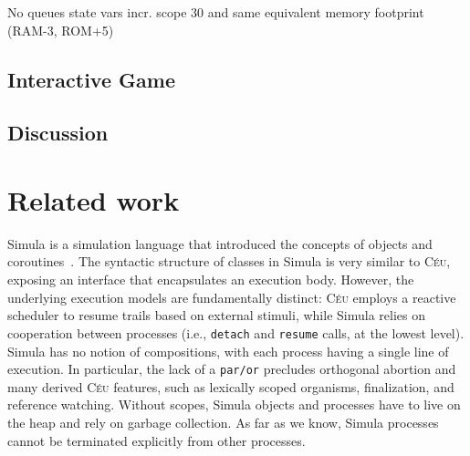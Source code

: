 \documentclass{sigplanconf}
\newcommand{\CEU}{\textsc{C\'{e}u}\xspace}
\newcommand{\code}[1] {{\small{\texttt{#1}}}}
\newcommand{\1}{\;}
\newcommand{\2}{\;\;}
\newcommand{\3}{\;\;\;}
\newcommand{\5}{\;\;\;\;\;}
\begin{document}
No queues
state vars
incr. scope
30%
and same equivalent memory footprint (RAM-3, ROM+5)


\subsection{Interactive Game}
\subsection{Discussion}

\section{Related work}
\label{sec.related}

Simula is a simulation language that introduced the concepts of objects and 
coroutines~\cite{simula}.
%
The syntactic structure of classes in Simula is very similar to \CEU, exposing 
an interface that encapsulates an execution body.
%
However, the underlying execution models are fundamentally distinct:
\CEU employs a reactive scheduler to resume trails based on external stimuli, 
while Simula relies on cooperation between processes (i.e., \code{detach} and 
\code{resume} calls, at the lowest level).
%
Simula has no notion of compositions, with each process having a single line of 
execution.
In particular, the lack of a \code{par/or} precludes orthogonal abortion and 
many derived \CEU features, such as lexically scoped organisms, finalization, 
and reference watching.
%
Without scopes, Simula objects and processes have to live on the heap and rely 
on garbage collection.
As far as we know, Simula processes cannot be terminated explicitly from other 
processes.
%
\end{document}
